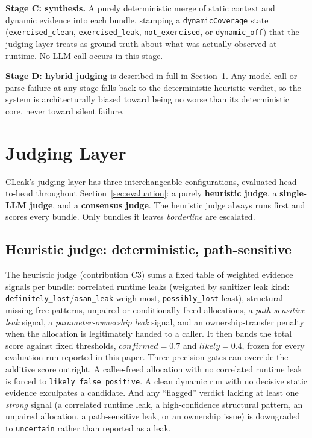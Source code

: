 \documentclass[11pt,a4paper]{article}
\begin{document}
\textbf{Stage C: synthesis.} A purely deterministic merge of static
context and dynamic evidence into each bundle, stamping a
\texttt{dynamicCoverage} state (\texttt{exercised\_clean},
\texttt{exercised\_leak}, \texttt{not\_exercised}, or \texttt{dynamic\_off})
that the judging layer treats as ground truth about what was actually
observed at runtime. No LLM call occurs in this stage.

\textbf{Stage D: hybrid judging} is described in full in
Section~\ref{sec:judging}. Any model-call or parse failure at any stage
falls back to the deterministic heuristic verdict, so the system is
architecturally biased toward being no worse than its deterministic core,
never toward silent failure.

\section{Judging Layer}
\label{sec:judging}

CLeak's judging layer has three interchangeable configurations, evaluated
head-to-head throughout Section~\ref{sec:evaluation}: a purely
\textbf{heuristic judge}, a \textbf{single-LLM judge}, and a
\textbf{consensus judge}. The heuristic judge always runs first and scores
every bundle. Only bundles it leaves \emph{borderline} are escalated.

\subsection{Heuristic judge: deterministic, path-sensitive}

The heuristic judge (contribution C3) sums a fixed table of weighted
evidence signals per bundle: correlated runtime leaks (weighted by
sanitizer leak kind: \texttt{definitely\_lost}/\texttt{asan\_leak} weigh
most, \texttt{possibly\_lost} least), structural missing-free patterns,
unpaired or conditionally-freed allocations, a \emph{path-sensitive leak}
signal, a \emph{parameter-ownership leak} signal, and an
ownership-transfer penalty when the allocation is legitimately handed to a
caller. It then bands the total score against fixed thresholds,
$\mathit{confirmed}=0.7$ and $\mathit{likely}=0.4$, frozen for every
evaluation run reported in this paper. Three precision gates can override
the additive score outright. A callee-freed allocation with no correlated
runtime leak is forced to \texttt{likely\_false\_positive}. A clean dynamic
run with no decisive static evidence exculpates a candidate. And any
``flagged'' verdict lacking at least one \emph{strong} signal (a correlated
runtime leak, a high-confidence structural pattern, an unpaired
allocation, a path-sensitive leak, or an ownership issue) is downgraded to
\texttt{uncertain} rather than reported as a leak.
\end{document}
